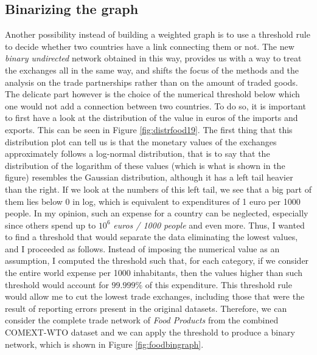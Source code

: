 \subsection{Binarizing the graph}\label{sec:3binarygraphs}
Another possibility instead of building a weighted graph is to use a threshold rule to decide whether two countries have a link connecting them or not. The new \textit{binary undirected} network obtained in this way, provides us with a way to treat the exchanges all in the same way, and shifts the focus of the methods and the analysis on the trade partnerships rather than on the amount of traded goods. The delicate part however is the choice of the numerical threshold below which one would not add a connection between two countries. To do so, it is important to first have a look at the distribution of the value in euros of the imports and exports. This can be seen in Figure \ref{fig:distrfood19}. 
The first thing that this distribution plot can tell us is that the monetary values of the exchanges approximately follows a log-normal distribution, that is to say that the distribution of the logarithm of these values (which is what is shown in the figure) resembles the Gaussian distribution, although it has a left tail heavier than the right. If we look at the numbers of this left tail, we see that a big part of them lies below 0 in log, which is equivalent to expenditures of 1 euro per 1000 people.
In my opinion, such an expense for a country can be neglected, especially since others spend up to $10^6$ \textit{euros / 1000 people} and even more. Thus, I wanted to find a threshold that would separate the data eliminating the lowest values, and I proceeded as follows. Instead of imposing the numerical value as an assumption, I computed the threshold such that, for each category, if we consider the entire world expense per 1000 inhabitants, then the values higher than such threshold would account for $99.999\%$ of this expenditure. This threshold rule would allow me to cut the lowest trade exchanges, including those that were the result of reporting errors present in the original datasets. Therefore, we can consider the complete trade network of \textit{Food Products} from the combined COMEXT-WTO dataset and we can apply the threshold to produce a binary network, which is shown in Figure \ref{fig:foodbingraph}.
